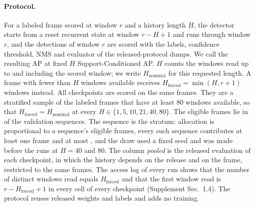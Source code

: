 \documentclass[10pt,twocolumn,letterpaper]{article}
\begin{document}
\paragraph{Protocol.}
For a labeled frame scored at window $r$ and a history length $H$, the detector starts from a reset recurrent state at window $r-H+1$ and runs through window $r$, and the detections of window $r$ are scored with the labels, confidence threshold, NMS and evaluator of the released-protocol dumps. We call the resulting AP at fixed $H$ Support-Conditioned AP. $H$ counts the windows read up to and including the scored window; we write $H_{\mathrm{nominal}}$ for this requested length. A frame with fewer than $H$ windows available receives $H_{\mathrm{forced}}=\min(H,r+1)$ windows instead. All checkpoints are scored on the same \lhNFrames{} frames. They are a stratified sample of the \lhNElig{} labeled frames that have at least 80 windows available, so that $H_{\mathrm{forced}}=H_{\mathrm{nominal}}$ at every $H\in\{1,5,10,21,40,80\}$. The eligible frames lie in \lhNEligSeq{} of the \lhNSeqAll{} validation sequences. The sequence is the stratum: allocation is proportional to a sequence's eligible frames, every such sequence contributes at least one frame and at most \lhMaxPerSeq{}, and the draw used a fixed seed and was made before the runs at $H=40$ and $80$. The column \emph{pooled} is the released evaluation of each checkpoint, in which the history depends on the release and on the frame, restricted to the same \lhNFrames{} frames. The access log of every run shows that the number of distinct windows read equals $H_{\mathrm{forced}}$ and that the first window read is $r-H_{\mathrm{forced}}+1$ in every cell of every checkpoint (Supplement Sec.~1.4). The protocol reuses released weights and labels and adds no training.
\end{document}
